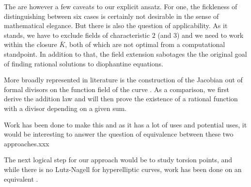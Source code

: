 \documentclass[english,11pt,a4paper]{article}
\begin{document}
The are however a few caveats to our explicit ansatz. For one, the fickleness of distinguishing between six cases is certainly not desirable in the sense of mathematical elegance. But there is also the question of applicability. As it stands, we have to exclude fields of characteristic $2$ (and $3$) and we need to work within the closure $\bar K$, both of which are not optimal from a computational standpoint. In addition to that, the field extension sabotages the the original goal of finding rational solutions to diophantine equations.

More broadly represented in literature is the construction of the Jacobian out of formal divisors on the function field of the curve \cite{cassels, zucc}. As a comparison, we first derive the addition law and will then prove the existence of a rational function with a divisor depending on a given sum. %

Work has been done to make this \cite{cantor} and as it has a lot of uses and potential uses, it would be interesting to answer the question of equivalence between these two approaches.xxx


The next logical step for our approach would be to study torsion points, and while there is no Lutz-Nagell for hyperelliptic curves, work has been done on an equivalent \cite{grantln}.










\end{document}
